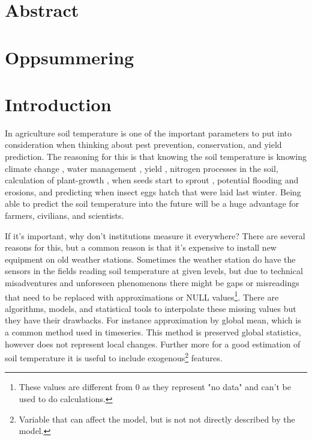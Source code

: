 \section{Abstract}



\section{Oppsummering}




\section{Introduction}

In agriculture soil temperature is one of the important parameters to put into consideration when thinking about pest prevention, conservation, and yield prediction. The reasoning for this is that knowing the soil temperature is knowing climate change \cite{li_attention-aware_2022}, water management \cite{alizamir_advanced_2020}, yield \cite{sim_prediction_2020}, nitrogen processes \cite{rankinen_simple_2004} in the soil, calculation of plant-growth \cite{li_modeling_2020}, when seeds start to sprout \cite{li_modeling_2020}, potential flooding and erosions\cite{stuurop_influence_2022}, and predicting when insect eggs hatch that were laid last winter. Being able to predict the soil temperature into the future will be a huge advantage for farmers, civilians, and scientists.

If it's important, why don't institutions measure it everywhere? There are several reasons for this, but a common reason is that it's expensive to install new equipment on old weather stations. Sometimes the weather station do have the sensors in the fields reading soil temperature at given levels, but due to technical misadventures and unforeseen phenomenons there might be gaps or misreadings that need to be replaced with approximations or NULL values\footnote{These values are different from 0 as they represent "no data" and can't be used to do calculations.}. There are algorithms, models, and statistical tools to interpolate these missing values but they have their drawbacks. For instance approximation by global mean, which is a common method used in timeseries\cite{lepot_interpolation_2017}. This method is preserved global statistics, however does not represent local changes. Further more for a good estimation of soil temperature it is useful to include exogenous\footnote{Variable that can affect the model, but is not not directly described by the model.} features.

